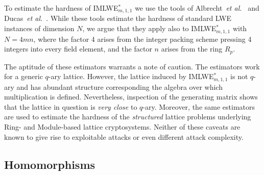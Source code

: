 To estimate the hardness of IMLWE$^*_{m, 1, 1}$ we use the tools of Albrecht~\emph{et al.}~\cite{albrecht-estimator} and Ducas~\emph{et al.}~\cite{ducas-estimator}. While these tools estimate the hardness of standard LWE instances of dimension $N$, we argue that they apply also to IMLWE$^*_{m,1,1}$ with $N = 4 m n$, where the factor 4 arises from the integer packing scheme pressing 4 integers into every field element, and the factor $n$ arises from the ring $R_p$.

The aptitude of these estimators warrants a note of caution. The estimators work for a generic $q$-ary lattice. However, the lattice induced by IMLWE$^*_{m,1,1}$ is not $q$-ary and has abundant structure corresponding the algebra over which multiplication is defined. Nevertheless, inspection of the generating matrix shows that the lattice in question is \emph{very close} to $q$-ary. Moreover, the same estimators are used to estimate the hardness of the \emph{structured} lattice problems underlying Ring- and Module-based lattice cryptosystems. Neither of these caveats are known to give rise to exploitable attacks or even different attack complexity.



\subsection{Homomorphisms}

